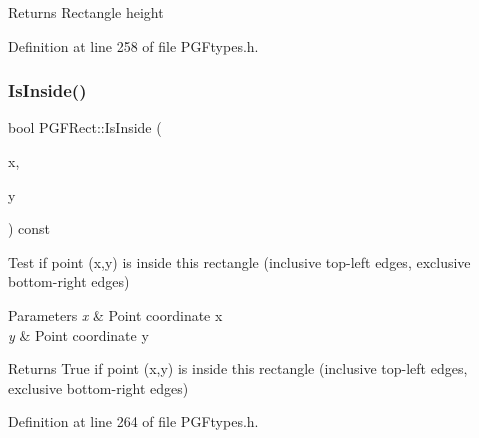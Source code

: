 \begin{DoxyReturn}{Returns}
Rectangle height 
\end{DoxyReturn}


Definition at line 258 of file P\+G\+Ftypes.\+h.


\begin{DoxyCode}{0}

\end{DoxyCode}
\mbox{\label{structPGFRect_a3bf955a2a3e56756776391ed71d1de80}} 
\subsubsection{\texorpdfstring{IsInside()}{IsInside()}}
{\footnotesize\ttfamily bool P\+G\+F\+Rect\+::\+Is\+Inside (\begin{DoxyParamCaption}\item[{U\+I\+N\+T32}]{x,  }\item[{U\+I\+N\+T32}]{y }\end{DoxyParamCaption}) const\hspace{0.3cm}{\ttfamily [inline]}}

Test if point (x,y) is inside this rectangle (inclusive top-\/left edges, exclusive bottom-\/right edges) 
\begin{DoxyParams}{Parameters}
{\em x} & Point coordinate x \\
\hline
{\em y} & Point coordinate y \\
\hline
\end{DoxyParams}
\begin{DoxyReturn}{Returns}
True if point (x,y) is inside this rectangle (inclusive top-\/left edges, exclusive bottom-\/right edges) 
\end{DoxyReturn}


Definition at line 264 of file P\+G\+Ftypes.\+h.


\begin{DoxyCode}{0}

\end{DoxyCode}
\mbox{\label{structPGFRect_a70d366f5adc104f7037b627f35a18729}} 
